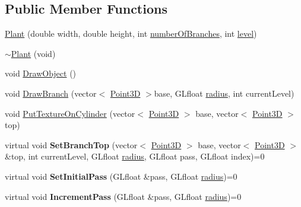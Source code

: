 \subsection*{Public Member Functions}
\begin{DoxyCompactItemize}
\item 
\hyperlink{class_plant_ac5fefc6f365188701cbc72d92ca42af1}{Plant} (double width, double height, int \hyperlink{class_plant_a4f86c46865d6211636140cef8805c6ee}{number\+Of\+Branches}, int \hyperlink{class_plant_ab49e92a2ab4ecdc762b5a1711fa3d65f}{level})
\item 
\hyperlink{class_plant_ac63f88c71ee3a3da6d6bdcf0111268e1}{$\sim$\+Plant} (void)
\item 
void \hyperlink{class_plant_ac04e2a45a28c7fa0d97b3c764128c9e5}{Draw\+Object} ()
\item 
void \hyperlink{class_plant_ac4b9655b2932b5dab8cc67671ca9e89f}{Draw\+Branch} (vector$<$ \hyperlink{struct_point3_d}{Point3\+D} $>$base, G\+Lfloat \hyperlink{class_plant_abef0f751fe6b1b43ed208966a70b4ab3}{radius}, int current\+Level)
\item 
void \hyperlink{class_plant_a8d678cebc0b25205820d111a27d90344}{Put\+Texture\+On\+Cylinder} (vector$<$ \hyperlink{struct_point3_d}{Point3\+D} $>$ base, vector$<$ \hyperlink{struct_point3_d}{Point3\+D} $>$ top)
\item 
\hypertarget{class_plant_a9660240dc434e603ea26335eed9e3c7a}{virtual void {\bfseries Set\+Branch\+Top} (vector$<$ \hyperlink{struct_point3_d}{Point3\+D} $>$ base, vector$<$ \hyperlink{struct_point3_d}{Point3\+D} $>$ \&top, int current\+Level, G\+Lfloat \hyperlink{class_plant_abef0f751fe6b1b43ed208966a70b4ab3}{radius}, G\+Lfloat pass, G\+Lfloat index)=0}\label{class_plant_a9660240dc434e603ea26335eed9e3c7a}

\item 
\hypertarget{class_plant_a66954b597c49fc536cebe914697b762b}{virtual void {\bfseries Set\+Initial\+Pass} (G\+Lfloat \&pass, G\+Lfloat \hyperlink{class_plant_abef0f751fe6b1b43ed208966a70b4ab3}{radius})=0}\label{class_plant_a66954b597c49fc536cebe914697b762b}

\item 
\hypertarget{class_plant_a77a88d6d25e58b0cf9bd5f6aaa5d9572}{virtual void {\bfseries Increment\+Pass} (G\+Lfloat \&pass, G\+Lfloat \hyperlink{class_plant_abef0f751fe6b1b43ed208966a70b4ab3}{radius})=0}\label{class_plant_a77a88d6d25e58b0cf9bd5f6aaa5d9572}

\end{DoxyCompactItemize}
